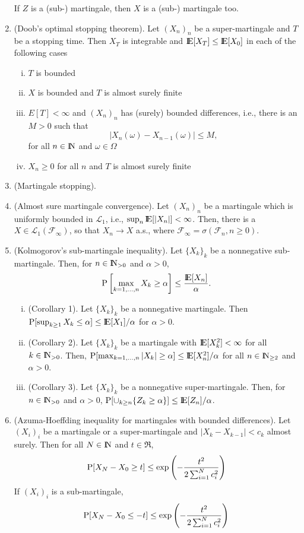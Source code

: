 \documentclass[a4paper,10pt]{scrbook}
\begin{document}
\begin{enumerate}
\[       \]
       If $Z$ is a (sub-) martingale, then $X$ is a (sub-) martingale too.
 \item (Doob's optimal stopping theorem). Let \((X_n)_n\) be a super-martingale and \(T\) be a stopping 
       time. Then \(X_T\) is integrable and \(\E[X_T] \leq \E[X_0]\) in each of the following cases
	  \begin{enumerate}[i.]
	   \item \(T\) is bounded 
	   \item \(X\) is bounded and \(T\) is almost surely finite
	   \item \(E[T]<\infty\) and \((X_n)_n\) has (surely) bounded differences, i.e., there is an \(M>0\) such that
	    \[
	     |X_n(\omega) - X_{n-1}(\omega)| \leq M, 
	    \]
	   for all \(n\in\N\) and \(\omega\in\Omega\)
	   \item \(X_n\geq 0\) for all \(n\) and \(T\) is almost surely finite
	  \end{enumerate}

 \item (Martingale stopping).
 \item (Almost sure martingale convergence). Let $(X_n)_n$ be a martingale which is uniformly 
       bounded in $\mathcal{L}_1$, i.e., $\sup_n \E[|X_n|] < \infty$. Then, there is a $X\in\mathcal{L}_1(\mathcal{F}_\infty)$,
       so that $X_n\to X$ a.s., where $\mathcal{F}_\infty = \sigma(\mathcal{F}_n, n\geq 0)$.
 \item (Kolmogorov's sub-martingale inequality). Let $\{X_k\}_k$ be a nonnegative sub-martingale.
       Then, for $n\in\N_{>0}$ and $\alpha>0$,
       \[
        \prob\left[ \max_{k=1,\ldots, n}X_k \geq \alpha\right] \leq \frac{\E[X_n]}{\alpha}.
       \]
       \begin{enumerate}[i.]
        \item (Corollary 1). Let $\{X_k\}_k$ be a nonnegative martingale. 
              Then $\prob[\sup_{k\geq 1}X_k \leq \alpha]\leq\E[X_1]/\alpha$ for $\alpha>0$.
        \item (Corollary 2). Let $\{X_k\}_k$ be a martingale with $\E[X_k^2]< \infty$ for all $k\in\N_{>0}$. 
               Then, $\prob[\max_{k=1,\ldots, n}|X_k|\geq \alpha]\leq \E[X_n^2]/\alpha$ for all $n\in \N_{\geq 2}$
               and $\alpha>0$.
        \item (Corollary 3). Let $\{X_k\}_k$ be a nonnegative super-martingale. Then, for $n\in\N_{>0}$
              and $\alpha>0$, $\prob[\cup_{k\geq n}\{Z_k\geq \alpha\}]\leq\E[Z_n]/\alpha$.
       \end{enumerate}


 \item (Azuma-Hoeffding inequality for martingales with bounded differences). Let $(X_i)_i$
       be a martingale or a  super-martingale and $|X_k-X_{k-1}|<c_{k}$ almost surely. Then for all $N\in\N$
       and $t\in\Re$,
       \[
        \mathrm{P}[X_N-X_0\geq t] \leq \exp \left(-\frac{t^2}{2\sum_{i=1}^{N}c_i^2}\right)
       \]
       If $(X_i)_i$ is a sub-martingale, 
       \[
        \mathrm{P}[X_N-X_0\leq -t] \leq \exp \left(-\frac{t^2}{2\sum_{i=1}^{N}c_i^2}\right)
       \]

\end{enumerate}
\end{document}
